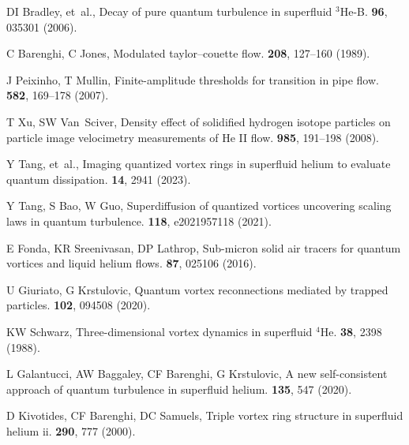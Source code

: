 \documentclass[9pt,twocolumn,twoside]{pnas-new}
\begin{document}
\begin{thebibliography}{10}
	DI Bradley, et~al., Decay of pure quantum turbulence in superfluid $^3${{H}}e-{{B}}.
	 \textbf{96}, 035301 (2006).
	
	C Barenghi, C Jones, Modulated taylor--couette flow.
	 \textbf{208}, 127--160 (1989).
	
	J Peixinho, T Mullin, Finite-amplitude thresholds for transition in pipe flow.
	 \textbf{582}, 169--178 (2007).
	
	T Xu, SW Van~Sciver, {Density effect of solidified hydrogen isotope particles on particle image velocimetry measurements of He II flow}.
	 \textbf{985}, 191--198 (2008).
	
	Y Tang, et~al., Imaging quantized vortex rings in superfluid helium to evaluate quantum dissipation.
	 \textbf{14}, 2941 (2023).
	
	Y Tang, S Bao, W Guo, Superdiffusion of quantized vortices uncovering scaling laws in quantum turbulence.
	 \textbf{118}, e2021957118 (2021).
	
	E Fonda, KR Sreenivasan, DP Lathrop, {Sub-micron solid air tracers for quantum vortices and liquid helium flows}.
	 \textbf{87}, 025106 (2016).
	
	U Giuriato, G Krstulovic, Quantum vortex reconnections mediated by trapped particles.
	 \textbf{102}, 094508 (2020).
	
	{\relax KW} Schwarz, Three-dimensional vortex dynamics in superfluid {$^{4}$}{{He}}.
	 \textbf{38}, 2398 (1988).
	
	L Galantucci, AW Baggaley, CF Barenghi, G Krstulovic, A new self-consistent approach of quantum turbulence in superfluid helium.
	 \textbf{135}, 547 (2020).
	
	D Kivotides, CF Barenghi, DC Samuels, Triple vortex ring structure in superfluid helium ii.
	 \textbf{290}, 777 (2000).
	
	\end{thebibliography}
	
\end{document}
